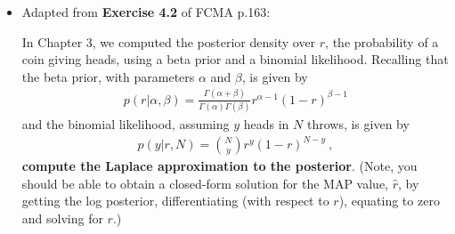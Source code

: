 \documentclass[10pt]{article}
\begin{document}
\begin{itemize}
\begin{eqnarray*}
\begin{aligned}
{- \frac{1}{2} \mathbf{t}^\top \mathbf{t} - \beta}
{\sigma^2}
\right\}
\\
&=
\left(
(\sigma^2)^{-\alpha-1} (\sigma^2)^{-D/2}
\right)
\exp \left\{
\frac{
- \frac{1}{2}((\mathbf{X}\mathbf{w})^\top \mathbf{X}\mathbf{w}) 
+ \mathbf{w}^\top \mathbf{X}^\top \mathbf{t}
- \frac{1}{2} \mathbf{t}^\top \mathbf{t} - \beta}
{\sigma^2}
\right\}
\\
&=
\left(
(\sigma^2)^{(-\alpha - D/2 - 1)}
\right)
\exp \left\{
\frac{
- \frac{1}{2}((\mathbf{X}\mathbf{w})^\top \mathbf{X}\mathbf{w}) 
+ \mathbf{w}^\top \mathbf{X}^\top \mathbf{t}
- \frac{1}{2} \mathbf{t}^\top \mathbf{t} - \beta}
{\sigma^2}
\right\}
\\
\hat{\alpha} &= \alpha + D/2
\\
\hat{\beta} &=
- \frac{1}{2}((\mathbf{X}\mathbf{w})^\top \mathbf{X}\mathbf{w}) 
+ \mathbf{w}^\top \mathbf{X}^\top \mathbf{t}
- \frac{1}{2} \mathbf{t}^\top \mathbf{t} - \beta
\end{aligned}
\end{eqnarray*}

\item[2.]  [6 points]
Adapted from {\bf Exercise 4.2} of FCMA p.163:

In Chapter 3, we computed the posterior density over $r$, the probability of a coin giving heads, using a beta prior and a binomial likelihood.  Recalling that the beta prior, with parameters $\alpha$ and $\beta$, is given by
\begin{eqnarray*}
p(r | \alpha, \beta) = \frac{\Gamma(\alpha + \beta)}{\Gamma(\alpha) \Gamma(\beta)} r^{\alpha - 1} (1 - r)^{\beta - 1}
\end{eqnarray*}
and the binomial likelihood, assuming $y$ heads in $N$ throws, is given by
\begin{eqnarray*}
p(y | r, N) = {N \choose y} r^{y} (1 - r)^{N-y} ~,
\end{eqnarray*}
{\bf compute the Laplace approximation to the posterior}.  (Note, you should be able to obtain a closed-form solution for the MAP value, $\hat{r}$, by getting the log posterior, differentiating (with respect to $r$), equating to zero and solving for $r$.)


\end{itemize}
\end{document}
